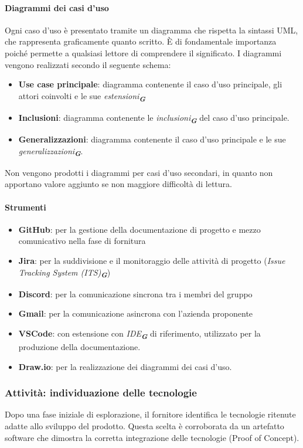 \documentclass[a4paper,12pt]{article}
\newcommand{\glossario}[1]{\textit{#1}\textsubscript{\textbf{\textit{\textcolor{lightblack}{G}}}}}
\begin{document}
\paragraph{Diagrammi dei casi d'uso}
Ogni caso d'uso è presentato tramite un diagramma che rispetta la sintassi UML,
che rappresenta graficamente quanto scritto. È di fondamentale importanza
poiché permette a qualsiasi lettore di comprendere il significato. I diagrammi
vengono realizzati secondo il seguente schema:
\begin{itemize}
    \item \textbf{Use case principale}: diagramma contenente il caso d'uso principale, gli attori coinvolti e le sue \glossario{estensioni}
    \item \textbf{Inclusioni}: diagramma contenente le \glossario{inclusioni} del caso d'uso principale.
    \item \textbf{Generalizzazioni}: diagramma contenente il caso d'uso principale e le sue \glossario{generalizzazioni}.
\end{itemize}
Non vengono prodotti i diagrammi per casi d'uso secondari, in quanto non apportano valore aggiunto se non maggiore difficoltà di lettura.

\paragraph{Strumenti}
\begin{itemize}
    \item \textbf{GitHub}: per la gestione della documentazione di progetto e mezzo comunicativo
          nella fase di fornitura
    \item \textbf{Jira}: per la suddivisione e il monitoraggio delle attività di progetto
          (\glossario{Issue Tracking System (ITS)})
    \item \textbf{Discord}: per la comunicazione sincrona tra i membri del gruppo
    \item \textbf{Gmail}: per la comunicazione asincrona con l'azienda proponente
    \item \textbf{VSCode}: con estensione con \glossario{IDE} di riferimento, utilizzato per la
          produzione della documentazione.
    \item \textbf{Draw.io}: per la realizzazione dei diagrammi dei casi d'uso.
\end{itemize}

\subsubsection{Attività: individuazione delle tecnologie}
Dopo una fase iniziale di esplorazione, il fornitore identifica le tecnologie
ritenute adatte allo sviluppo del prodotto. Questa scelta è corroborata da un
artefatto software che dimostra la corretta integrazione delle tecnologie
(Proof of Concept).
\end{document}

